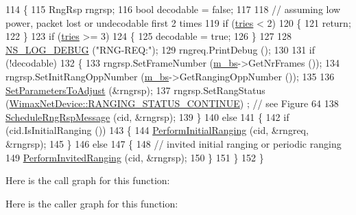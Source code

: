 \begin{DoxyCode}
114 \{
115   RngRsp rngrsp;
116   \textcolor{keywordtype}{bool} decodable = \textcolor{keyword}{false};
117 
118   \textcolor{comment}{// assuming low power, packet lost or undecodable first 2 times}
119   \textcolor{keywordflow}{if} (\hyperlink{classns3_1_1BSLinkManager_a7eeaf72c73cddf69a0a5cb90ab1c1fc1}{tries} < 2)
120     \{
121       \textcolor{keywordflow}{return};
122     \}
123   \textcolor{keywordflow}{if} (\hyperlink{classns3_1_1BSLinkManager_a7eeaf72c73cddf69a0a5cb90ab1c1fc1}{tries} >= 3)
124     \{
125       decodable = \textcolor{keyword}{true};
126     \}
127 
128   \hyperlink{group__logging_ga413f1886406d49f59a6a0a89b77b4d0a}{NS\_LOG\_DEBUG} (\textcolor{stringliteral}{"RNG-REQ:"});
129   rngreq.PrintDebug ();
130 
131   \textcolor{keywordflow}{if} (!decodable)
132     \{
133       rngrsp.SetFrameNumber (\hyperlink{classns3_1_1BSLinkManager_a03e8b376dd28651abfeded291ea52fc8}{m\_bs}->GetNrFrames ());
134       rngrsp.SetInitRangOppNumber (\hyperlink{classns3_1_1BSLinkManager_a03e8b376dd28651abfeded291ea52fc8}{m\_bs}->GetRangingOppNumber ());
135 
136       \hyperlink{classns3_1_1BSLinkManager_aaf3edf52fbc826d504c521f5303f309f}{SetParametersToAdjust} (&rngrsp);
137       rngrsp.SetRangStatus (\hyperlink{classns3_1_1WimaxNetDevice_a2a74c0f01e51abc1851a630242e7b591ace0a03105b6d7cf2c6ec79e9789dc3a6}{WimaxNetDevice::RANGING\_STATUS\_CONTINUE})
      ; \textcolor{comment}{// see Figure 64}
138       \hyperlink{classns3_1_1BSLinkManager_a80ee98e2b166372c03c840b8904e062a}{ScheduleRngRspMessage} (cid, &rngrsp);
139     \}
140   \textcolor{keywordflow}{else}
141     \{
142       \textcolor{keywordflow}{if} (cid.IsInitialRanging ())
143         \{
144           \hyperlink{classns3_1_1BSLinkManager_a8c97286c0b9d58f6b175e7f4e82ccd36}{PerformInitialRanging} (cid, &rngreq, &rngrsp);
145         \}
146       \textcolor{keywordflow}{else}
147         \{
148           \textcolor{comment}{// invited initial ranging or periodic ranging}
149           \hyperlink{classns3_1_1BSLinkManager_a094fa709f5eaa532b959808967b65464}{PerformInvitedRanging} (cid, &rngrsp);
150         \}
151     \}
152 \}
\end{DoxyCode}


Here is the call graph for this function\+:




Here is the caller graph for this function\+:


